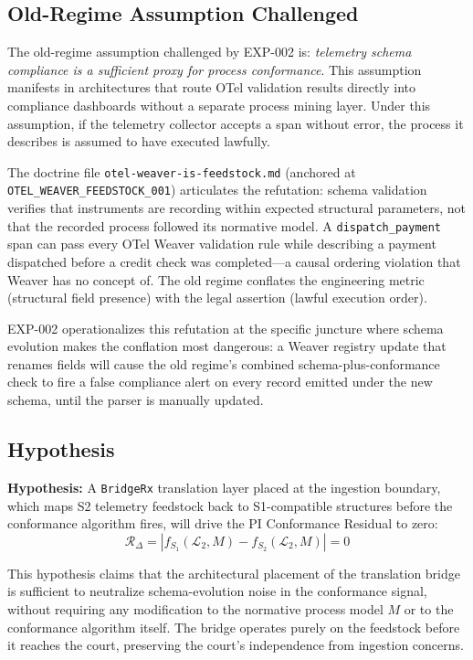 \subsection{Old-Regime Assumption Challenged}
\label{sec:otel-weaver-exp-002-diff-to-residual-rq-old-regime}

The old-regime assumption challenged by EXP-002 is: \emph{telemetry schema
compliance is a sufficient proxy for process conformance}. This assumption manifests
in architectures that route OTel validation results directly into compliance
dashboards without a separate process mining layer. Under this assumption, if the
telemetry collector accepts a span without error, the process it describes is assumed
to have executed lawfully.

The doctrine file \texttt{otel-weaver-is-feedstock.md} (anchored at
\texttt{OTEL\_WEAVER\_FEEDSTOCK\_001}) articulates the refutation: schema validation
verifies that instruments are recording within expected structural parameters, not that
the recorded process followed its normative model. A \texttt{dispatch\_payment} span
can pass every OTel Weaver validation rule while describing a payment dispatched
before a credit check was completed---a causal ordering violation that Weaver has no
concept of. The old regime conflates the engineering metric (structural field
presence) with the legal assertion (lawful execution order).

EXP-002 operationalizes this refutation at the specific juncture where schema evolution
makes the conflation most dangerous: a Weaver registry update that renames fields
will cause the old regime's combined schema-plus-conformance check to fire a false
compliance alert on every record emitted under the new schema, until the parser is
manually updated.

\subsection{Hypothesis}
\label{sec:otel-weaver-exp-002-diff-to-residual-rq-hypothesis}

\textbf{Hypothesis:} A \texttt{BridgeRx} translation layer placed at the ingestion
boundary, which maps S2 telemetry feedstock back to S1-compatible structures before
the conformance algorithm fires, will drive the PI Conformance Residual to zero:
\[
    \mathcal{R}_{\Delta} = |f_{S_1}(\mathcal{L}_2, M) - f_{S_2}(\mathcal{L}_2, M)| = 0
\]

This hypothesis claims that the architectural placement of the translation bridge is
sufficient to neutralize schema-evolution noise in the conformance signal, without
requiring any modification to the normative process model $M$ or to the conformance
algorithm itself. The bridge operates purely on the feedstock before it reaches the
court, preserving the court's independence from ingestion concerns.

